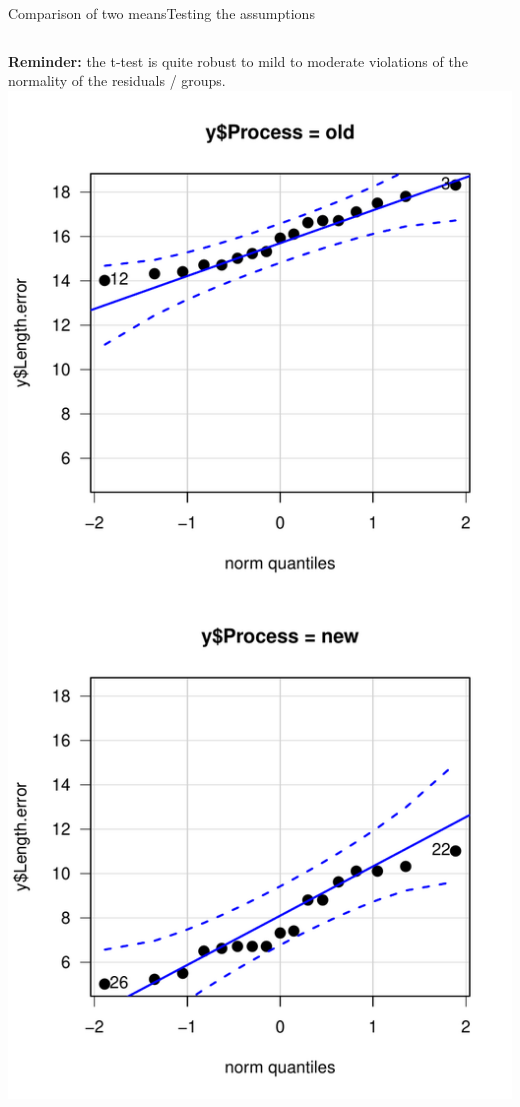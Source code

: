 \begin{frame}[fragile]{Comparison of two means}{Testing the assumptions}
\begin{columns}[T]
{\bf Reminder:} the t-test is quite robust to mild to moderate violations of the normality of the residuals / groups.
\includegraphics[width=1\textwidth]{../img/steelrodsqq.pdf}
\end{columns}
\end{frame}

